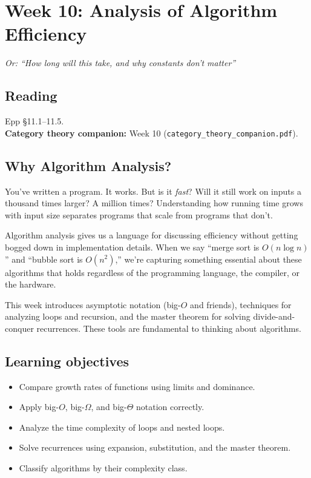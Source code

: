 \section{Week 10: Analysis of Algorithm Efficiency}

\textit{Or: ``How long will this take, and why constants don't matter''}

\subsection*{Reading}
Epp \S 11.1--11.5.\\
\textbf{Category theory companion:} Week 10 (\texttt{category\_theory\_companion.pdf}).

\subsection*{Why Algorithm Analysis?}

You've written a program. It works. But is it \emph{fast}? Will it still work on inputs a thousand times larger? A million times? Understanding how running time grows with input size separates programs that scale from programs that don't.

Algorithm analysis gives us a language for discussing efficiency without getting bogged down in implementation details. When we say ``merge sort is $O(n \log n)$'' and ``bubble sort is $O(n^2)$,'' we're capturing something essential about these algorithms that holds regardless of the programming language, the compiler, or the hardware.

This week introduces asymptotic notation (big-$O$ and friends), techniques for analyzing loops and recursion, and the master theorem for solving divide-and-conquer recurrences. These tools are fundamental to thinking about algorithms.

\subsection*{Learning objectives}
\begin{itemize}
  \item Compare growth rates of functions using limits and dominance.
  \item Apply big-$O$, big-$\Omega$, and big-$\Theta$ notation correctly.
  \item Analyze the time complexity of loops and nested loops.
  \item Solve recurrences using expansion, substitution, and the master theorem.
  \item Classify algorithms by their complexity class.
\end{itemize}

